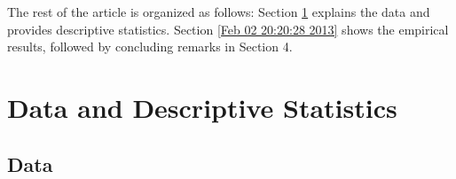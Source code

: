 \documentclass[fleqn,11pt]{article}
\begin{document}


The rest of the article is organized as follows: Section \ref{sec:data} explains the data and provides descriptive statistics.
Section \ref{Feb 02 20:20:28 2013} shows
the empirical results, followed by concluding remarks in Section 4.

\section{Data and Descriptive Statistics}

\label{sec:data} 
\subsection{Data}


\end{document}
